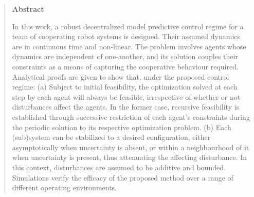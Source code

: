 

\begin{quotation}

\begin{center}
\textbf{Abstract}
\end{center}
\noindent
In this work, a robust decentralized model predictive control regime for a team
of cooperating robot systems is designed. Their assumed dynamics are
in continuous time and non-linear. The problem involves agents whose dynamics
are independent of one-another, and its solution couples their constraints as a
means of capturing the cooperative behaviour required.
Analytical proofs are given to show that, under the proposed control regime:
(a) Subject to initial feasibility, the optimization solved at each step
by each agent will always be feasible, irrespective of whether or not
disturbances affect the agents. In the former case, recursive feasibility is
established through successive restriction of each agent's constraints during
the periodic solution to its respective optimization problem.
(b) Each (sub)system can be stabilized to a desired configuration, either
asymptotically when uncertainty is absent, or within a neighbourhood of it when
uncertainty is present, thus attenuating the affecting disturbance.
In this context, disturbances are assumed to be additive and bounded.
Simulations verify the efficacy of the proposed method over a range of different
operating environments.

\end{quotation}

\restoregeometry

